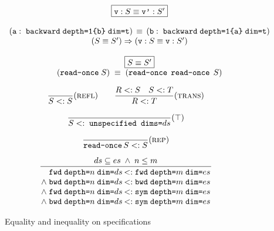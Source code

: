 \documentclass[10pt]{sigplanconf}
\theoremstyle{definition}
\begin{document}
\begin{figure*}
\begin{align*}
\begin{array}{c}
\framebox{$\texttt{v} : S \equiv \texttt{v'} : S'$} \\ \\
(\texttt{a} : \; \texttt{backward} \; \texttt{depth=1\{b\}} \;
  \texttt{dim=t}) 
\, \equiv \,
(\texttt{b} : \; \texttt{backward} \; \texttt{depth=1\{a\}} \;
  \texttt{dim=t})
 \\ 
(S \equiv S') \Rightarrow (\texttt{v} : S \equiv \texttt{v} : S')
\\ \\
\framebox{$S \equiv S'$} \\
(\texttt{read-once} \; S) \; \equiv \; (\texttt{read-once} \;\,
  \texttt{read-once} \; \, S) \\
\end{array}
\end{align*}

\begin{align*}
\hspace{-0.7em}
\begin{array}{c}
\dfrac{}{S <: S}(\textsc{refl}) \qquad \dfrac{R <: S \quad S <: T}{R <:
  T}(\textsc{trans}) \\[1.5em]
\dfrac{}{S <: \; \texttt{unspecified dims=}ds}(\top) 
\\[1.5em]
\dfrac{}{\texttt{read-once} \, S <: S}(\textsc{rep})
\\[1.5em]
\setlength{\arraycolsep}{0.1em}
\dfrac{\hspace{3em} ds \subseteq es \; \wedge \; n \leq m \hspace{3em}}
{\begin{array}{rl}
\texttt{fwd} \; \texttt{depth=}n \; \texttt{dim=}ds & <: \texttt{fwd} \;
  \texttt{depth=}m \; \texttt{dim=}es 
\\
\wedge \; \texttt{bwd} \; \texttt{depth=}n \; \texttt{dim=}ds & <: \texttt{bwd} \;
  \texttt{depth=}m \; \texttt{dim=}es 
\\
\wedge \; \texttt{fwd} \; \texttt{depth=}n \; \texttt{dim=}ds & <: \texttt{sym} \;
  \texttt{depth=}m \; \texttt{dim=}es 
\\
\wedge \; \texttt{bwd} \; \texttt{depth=}n \; \texttt{dim=}ds & <: \texttt{sym} \;
  \texttt{depth=}m \; \texttt{dim=}es 
\end{array}}
\end{array}
\end{align*}

\caption{Equality and inequality on specifications}
\end{figure*}
\end{document}
